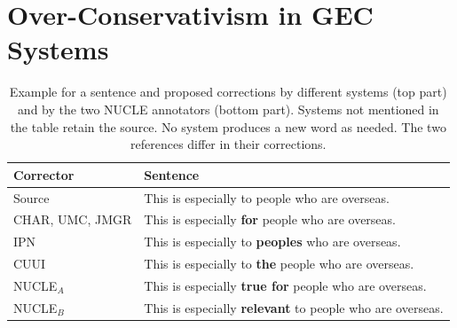\documentclass[letterpaper, 11pt]{article}
\begin{document}
\section{Over-Conservativism in GEC Systems}\label{sec:formal_conservatism}
\begin{table}
	\vspace{-0.5cm}
	\centering
	\small
	\singlespacing
	\begin{tabular}{l|p{4cm}}
		Corrector & Sentence \\
		\hline
		Source & This is especially to people who are overseas. \\
                \hline 
		CHAR, UMC, JMGR & This is especially \textbf{for} people who are overseas. \\ 
		IPN & This is especially to \textbf{peoples} who are overseas. \\ 
		CUUI &  This is especially to \textbf{the} people who are overseas. \\ 
		\hline
		NUCLE$_A$ & This is especially \textbf{true for} people who are overseas.\\
		NUCLE$_B$ & This is especially \textbf{relevant} to people who are overseas.
	\end{tabular}
	\caption{\label{tab:nucle_example} Example for a sentence and proposed corrections by different systems (top part) and by the two NUCLE annotators (bottom part). Systems not mentioned in the table retain the source. No system produces a new word as needed. The two references differ in their corrections.} 
	\vspace{-0.5cm}
\end{table} 
%
%
\end{document}
